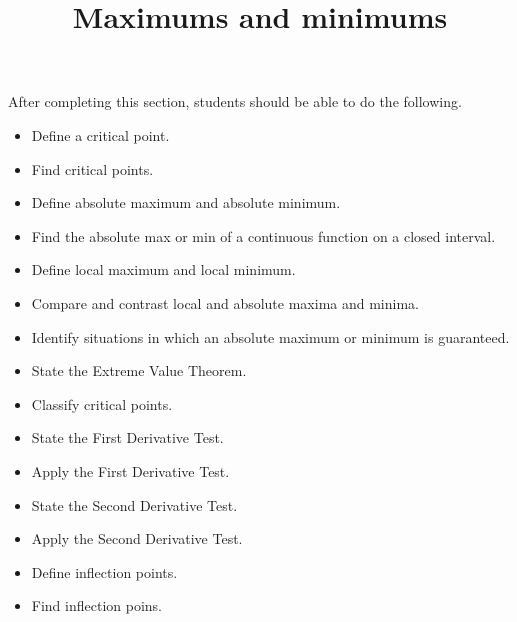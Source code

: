\documentclass{ximera}
\title{Maximums and minimums}
\begin{document}
\begin{abstract}
\end{abstract}

\maketitle

\begin{sectionOutcomes}

After completing this section, students should be able to do the following.

\begin{itemize}
	\item Define a critical point.
	\item Find critical points.
	\item Define absolute maximum and absolute minimum.
	\item Find the absolute max or min of a continuous function on a closed interval.
	\item Define local maximum and local minimum.
	\item Compare and contrast local and absolute maxima and minima.
	\item Identify situations in which an absolute maximum or minimum is guaranteed.
	\item State the Extreme Value Theorem.
	\item Classify critical points.
	\item State the First Derivative Test.
	\item Apply the First Derivative Test.
	\item State the Second Derivative Test.
	\item Apply the Second Derivative Test.
	\item Define inflection points.
	\item Find inflection poins.
\end{itemize}

\end{sectionOutcomes}
\end{document}
